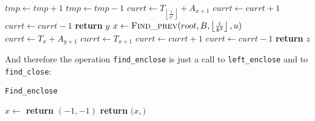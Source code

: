 \documentclass{article}
\begin{document}
    \begin{algorithm}[ht]
    \begin{algorithmic}[1]
                \State $tmp\gets tmp+1$
            \EndIf
                \State $tmp\gets tmp-1$
            \EndIf
        \EndFor
                \State $currt\gets T_{\left\lfloor{\frac{i}{k^2}}\right\rfloor}+A_{x+1}$
                        \State $currt\gets currt+1$
                    \EndIf
                        \State $currt\gets currt-1$
                    \EndIf
                        \State \textbf{return} $y$
                    \EndIf
                \EndFor
            \EndIf
        \EndFor
        \State
        \State $x\gets \Call{Find\_prev}{root,B,\left\lfloor{\frac{i}{k^2}}\right\rfloor,u}$ 
                    \State $currt\gets T_x+A_{y+1}$
                \Else
                    \State $currt\gets T_{x+1}$
                \EndIf
                        \State $currt\gets currt+1$
                    \EndIf
                        \State $currt\gets currt-1$
                    \EndIf
                        \State \textbf{return} $z$
                    \EndIf
                \EndFor
            \EndIf
        \EndFor
    \EndProcedure
    \end{algorithmic}
    \end{algorithm}
And therefore the operation \texttt{find\_enclose} is just a call to \texttt{left\_enclose} and to \texttt{find\_close}:
    \begin{algorithm}[H]
    \caption{\texttt{Find\_enclose}}\label{findenclose}
    \begin{algorithmic}[1]
    \State $x\gets$ 
        \State \textbf{return} $(-1,-1)$ 
    \Else
        \State \textbf{return} $(x,$$)$
    \EndIf
    \EndProcedure
    \end{algorithmic}
    \end{algorithm}
\end{document}
